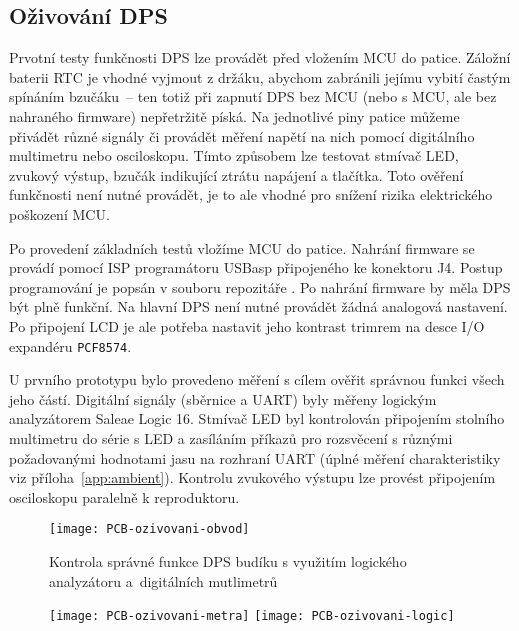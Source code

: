 \subsection{Oživování DPS}
Prvotní testy funkčnosti DPS lze provádět před vložením MCU do patice. Záložní
baterii RTC je vhodné vyjmout z držáku, abychom zabránili jejímu vybití častým
spínáním bzučáku~-- ten totiž při zapnutí DPS bez MCU (nebo s MCU, ale bez
nahraného firmware) nepřetržitě píská. Na jednotlivé piny patice můžeme přivádět
různé signály či provádět měření napětí na nich pomocí digitálního multimetru
nebo osciloskopu. Tímto způsobem lze testovat stmívač LED, zvukový výstup,
bzučák indikující ztrátu napájení a tlačítka. Toto ověření funkčnosti není
nutné provádět, je to ale vhodné pro snížení rizika elektrického poškození MCU.

Po provedení základních testů vložíme MCU do patice. Nahrání firmware se
provádí pomocí ISP programátoru USBasp připojeného ke konektoru J4. Postup
programování je popsán v souboru  repozitáře
. Po nahrání firmware by měla DPS být plně funkční.
Na hlavní DPS není nutné provádět žádná analogová nastavení. Po připojení LCD
je ale potřeba nastavit jeho kontrast trimrem na desce I/O expandéru
\texttt{PCF8574}.

U prvního prototypu bylo provedeno měření s cílem ověřit správnou funkci všech
jeho částí. Digitální signály (sběrnice \IIC{} a UART) byly měřeny logickým
analyzátorem Saleae Logic 16. Stmívač LED byl kontrolován připojením stolního
multimetru do série s LED a zasíláním příkazů pro rozsvěcení s různými
požadovanými hodnotami jasu na rozhraní UART (úplné měření charakteristiky viz
příloha~\vref{app:ambient}). Kontrolu zvukového výstupu lze provést připojením
osciloskopu paralelně k reproduktoru.

\begin{figure}[htbp]
    \centering
    \texttt{[image: PCB-ozivovani-obvod]}
    \caption{%
        Kontrola správné funkce DPS budíku s využitím logického analyzátoru
        a~digitálních mutlimetrů
    }
    \label{fig:PCB ozivovani logic}
\end{figure}
\begin{figure}\ContinuedFloat
    \centering
    \texttt{[image: PCB-ozivovani-metra]}
    \texttt{[image: PCB-ozivovani-logic]}
\end{figure}
